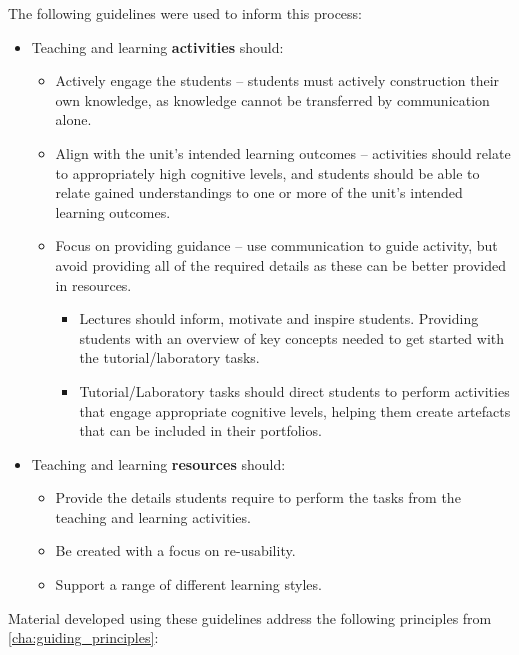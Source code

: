 %
% 

The following guidelines were used to inform this process:

\begin{itemize}[noitemsep,nolistsep]
	\item Teaching and learning \textbf{activities} should:
	\begin{itemize}[noitemsep,nolistsep]
	 	\item Actively engage the students -- students must actively construction their own knowledge, as knowledge cannot be transferred by communication alone.
	 	\item Align with the unit's intended learning outcomes -- activities should relate to appropriately high cognitive levels, and students should be able to relate gained understandings to one or more of the unit's intended learning outcomes.
	 	\item Focus on providing guidance -- use communication to guide activity, but avoid providing all of the required details as these can be better provided in resources.
	 	\begin{itemize}[noitemsep,nolistsep]
		 	\item Lectures should inform, motivate and inspire students. Providing students with an overview of key concepts needed to get started with the tutorial/laboratory tasks.
		 	\item Tutorial/Laboratory tasks should direct students to perform activities that engage appropriate cognitive levels, helping them create artefacts that can be included in their portfolios.
	 	\end{itemize}

	 \end{itemize} 

	\item Teaching and learning \textbf{resources} should:
	\begin{itemize}[noitemsep,nolistsep]
		\item Provide the details students require to perform the tasks from the teaching and learning activities.
		\item Be created with a focus on re-usability.
		\item Support a range of different learning styles.
	\end{itemize}
\end{itemize}

Material developed using these guidelines address the following principles from \cref{cha:guiding_principles}:

